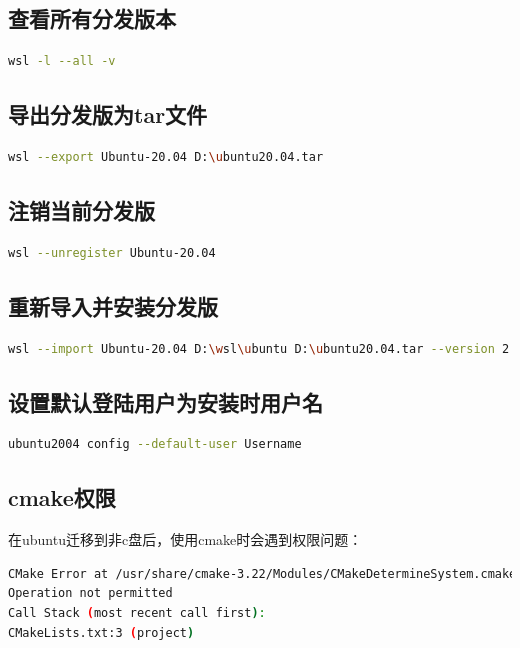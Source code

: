 \subsection{查看所有分发版本}
\begin{lstlisting}[language=bash]
	wsl -l --all -v
\end{lstlisting}


\subsection{导出分发版为tar文件}
\begin{lstlisting}[language=bash]
wsl --export Ubuntu-20.04 D:\ubuntu20.04.tar
\end{lstlisting}


\subsection{注销当前分发版}
\begin{lstlisting}[language=bash]
wsl --unregister Ubuntu-20.04
\end{lstlisting}


\subsection{重新导入并安装分发版}
\begin{lstlisting}[language=bash]
wsl --import Ubuntu-20.04 D:\wsl\ubuntu D:\ubuntu20.04.tar --version 2
\end{lstlisting}


\subsection{设置默认登陆用户为安装时用户名}
\begin{lstlisting}[language=bash]
ubuntu2004 config --default-user Username
\end{lstlisting}

\subsection{cmake权限}
在ubuntu迁移到非c盘后，使用cmake时会遇到权限问题：
\begin{lstlisting}[language=bash]
CMake Error at /usr/share/cmake-3.22/Modules/CMakeDetermineSystem.cmake:193 (configure_file):
Operation not permitted
Call Stack (most recent call first):
CMakeLists.txt:3 (project)
\end{lstlisting}

